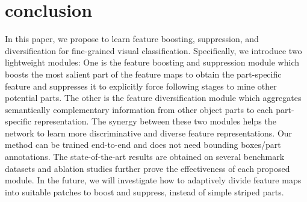 \documentclass[conference]{IEEEtran}
\begin{document}
	\section{conclusion}
	In this paper, we propose to learn feature boosting, suppression, and diversification for fine-grained visual classification. Specifically, we introduce two lightweight modules: One is the feature boosting and suppression module which boosts the most salient part of the feature maps to obtain the part-specific feature and suppresses it to explicitly force following stages to mine other potential parts.
	The other is the feature diversification module which aggregates semantically complementary information from other object parts to each part-specific representation.
	The synergy between these two modules helps the network to learn more discriminative and diverse feature representations. Our method can be trained end-to-end and does not need bounding boxes/part annotations. The state-of-the-art results are obtained on several benchmark datasets and ablation studies further prove the effectiveness of each proposed module. In the future, we will investigate how to adaptively divide feature maps into suitable patches to boost and suppress, instead of simple striped parts.
\end{document}
